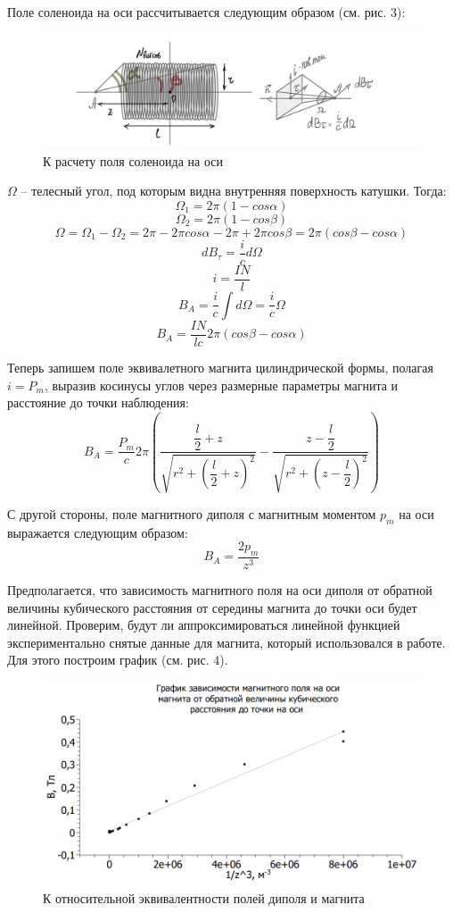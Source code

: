 \documentclass[a4paper,12pt]{article} %
\begin{document}
Поле соленоида на оси рассчитывается следующим образом (см. рис. 3):

\begin{figure}[h!]
	\centering
	\includegraphics[scale=0.28]{4.JPG}
	\caption{К расчету поля соленоида на оси}
\end{figure}

$\Omega$ -- телесный угол, под которым видна внутренняя поверхность катушки. Тогда:
$$\Omega_1 = 2\pi(1 - cos\alpha)$$
$$\Omega_2 = 2\pi(1 - cos\beta)$$ 
$$\Omega = \Omega_1 - \Omega_2 = 2\pi - 2\pi cos\alpha - 2\pi + 2\pi cos\beta = 2\pi (cos\beta - cos\alpha)$$
$$dB_\tau = \dfrac{i}{c}d\Omega$$
$$i = \dfrac{IN}{l}$$
$$B_A = \dfrac{i}{c}\int d\Omega = \dfrac{i}{c}\Omega$$
$$B_A = \dfrac{IN}{lc} 2\pi (cos\beta - cos\alpha)$$

Теперь запишем поле эквивалетного магнита цилиндрической формы, полагая $i = P_m$, выразив косинусы углов через размерные параметры магнита и расстояние до точки наблюдения: 
$$B_A = \dfrac{P_m}{c} 2\pi \left(\dfrac{\dfrac{l}{2} + z}{\sqrt{r^2 + \left(\dfrac{l}{2} + z\right)^2}} - \dfrac{z - \dfrac{l}{2}}{\sqrt{r^2 + \left(z - \dfrac{l}{2}\right)^2}}\right)$$

С другой стороны, поле магнитного диполя с магнитным моментом $p_m$ на оси выражается следующим образом: $$B_A = \dfrac{2p_m}{z^3}$$

Предполагается, что зависимость магнитного поля на оси диполя от обратной величины кубического расстояния от середины магнита до точки оси будет линейной. Проверим, будут ли аппроксимироваться линейной функцией экспериментально снятые данные для магнита, который использовался в работе. Для этого построим график (см. рис. 4).

\begin{figure}[h!]
	\centering
	\includegraphics[scale=1,2]{6.png}
	\caption{К относительной эквивалентности полей диполя и магнита}
\end{figure}
\end{document}
